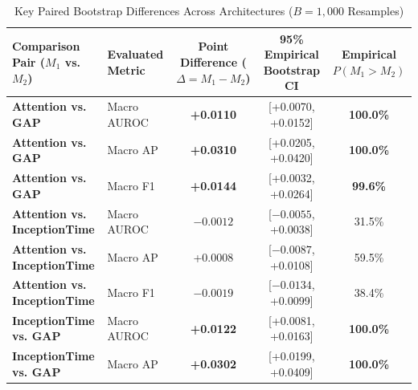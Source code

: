 \begin{table}[t]
\begin{subtable}{\textwidth}
\centering
\caption{Key Paired Bootstrap Differences Across Architectures ($B = 1,000$ Resamples)}
\begin{tabular}{llccc}
\toprule
\textbf{Comparison Pair ($M_1$ vs. $M_2$)} & \textbf{Evaluated Metric} & \textbf{Point Difference ($\Delta = M_1 - M_2$)} & \textbf{95\% Empirical Bootstrap CI} & \textbf{Empirical $P(M_1 > M_2)$} \\
\midrule
\textbf{Attention vs. GAP} & Macro AUROC & \textbf{+0.0110} & [+0.0070, +0.0152] & \textbf{100.0\%} \\
\textbf{Attention vs. GAP} & Macro AP    & \textbf{+0.0310} & [+0.0205, +0.0420] & \textbf{100.0\%} \\
\textbf{Attention vs. GAP} & Macro F1    & \textbf{+0.0144} & [+0.0032, +0.0264] & \textbf{99.6\%} \\
\midrule
\textbf{Attention vs. InceptionTime} & Macro AUROC & $-0.0012$ & [$-0.0055$, +0.0038] & 31.5\% \\
\textbf{Attention vs. InceptionTime} & Macro AP    & +0.0008 & [$-0.0087$, +0.0108] & 59.5\% \\
\textbf{Attention vs. InceptionTime} & Macro F1    & $-0.0019$ & [$-0.0134$, +0.0099] & 38.4\% \\
\midrule
\textbf{InceptionTime vs. GAP} & Macro AUROC & \textbf{+0.0122} & [+0.0081, +0.0163] & \textbf{100.0\%} \\
\textbf{InceptionTime vs. GAP} & Macro AP    & \textbf{+0.0302} & [+0.0199, +0.0409] & \textbf{100.0\%} \\
\bottomrule
\end{tabular}
\end{subtable}
\end{table}
